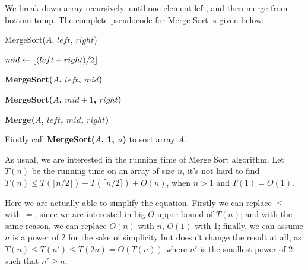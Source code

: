 \begin{spacing}{1.3}
    We break down array recursively, until one element left,
    and then merge from bottom to up.
    The complete pseudocode for Merge Sort is given below:

    \newpage
    \begin{algorithm}[H]
        \caption{MergeSort($A$, $left$, $right$)}
        $mid\leftarrow \lfloor (left + right) / 2 \rfloor$


        {\bf MergeSort($A$, $left$, $mid$)}

        {\bf MergeSort($A$, $mid+1$, $right$)}


        {\bf Merge($A$, $left$, $mid$, $right$)}
    \end{algorithm}

    Firstly call {\bf MergeSort($A$, 1, $n$)} to sort array $A$.
    
    As usual, we are interested in the running time of Merge Sort 
    algorithm. Let $T(n)$ be the running time on an array of size $n$,
    it's not hard to find 
    $T(n)\le T(\lfloor n/2 \rfloor) + T(\lceil n/2 \rceil)+O(n)$,
    when $n>1$ and $T(1)=O(1)$.

    Here we are actually able to simplify the equation. Firstly 
    we can replace $\le $ with $=$, since we are interested
    in big-$O$ upper bound of $T(n)$; and with the same 
    reason, we can replace $O(n)$ with $n$, $O(1)$ with 1;
    finally, we can assume $n$ is a power of 2 for the sake of 
    simplicity but doesn't change the result at all, as 
    $T(n)\le T(n')\le T(2n)=O(T(n))$ where $n'$ is the 
    smallest power of 2 such that $n'\ge n$.


\end{spacing}
